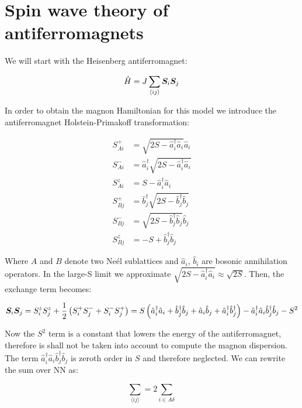 \chapter{Spin wave theory of antiferromagnets}
\label{SpinWave}

We will start with the Heisenberg antiferromagnet:

\begin{equation}
\hat{H} = J \sum_{\langle i j \rangle} \boldsymbol{S}_i \boldsymbol{S}_j
\end{equation}

In order to obtain the magnon Hamiltonian for this model we introduce the antiferromagnet Holstein-Primakoff transformation:

\begin{align}
S^+_{Ai} &= \sqrt{2S-\hat{a}^\dagger_i \hat{a}_i} \hat{a}_i \\
S^-_{Ai} &= \hat{a}^\dagger_i\sqrt{2S-\hat{a}^\dagger_i \hat{a}_i}  \\
S^z_{Ai} &= S - \hat{a}^\dagger_i \hat{a}_i \\
S^+_{Bj} &=\hat{b}^\dagger_j\sqrt{2S-\hat{b}^\dagger_j \hat{b}_j} \\
S^-_{Bj} &= \sqrt{2S-\hat{b}^\dagger_j \hat{b}_j} \hat{b}_j \\
S^z_{Bj} &= -S + \hat{b}^\dagger_j \hat{b}_j
\end{align}

Where $A$ and $B$ denote two Ne\'{e}l sublattices and $\hat{a}_i$, $\hat{b}_i$ are bosonic annihilation operators. In the large-S limit we approximate $ \sqrt{2S-\hat{a}^\dagger_i \hat{a}_i} \approx \sqrt{2S}$. Then, the exchange term becomes:

\begin{align*}
\boldsymbol{S}_i\boldsymbol{S}_j = S_i^zS_j^z + \frac{1}{2}\left(S_i^+S_j^- + S_i^-S_j^+ \right) = S \left( \hat{a}^\dagger_i \hat{a}_i + \hat{b}^\dagger_j \hat{b}_j + \hat{a}_i\hat{b}_j + \hat{a}^\dagger_i\hat{b}^\dagger_j \right) - \hat{a}^\dagger_i \hat{a}_i\hat{b}^\dagger_j \hat{b}_j - S^2
\end{align*}

Now the $S^2$ term is a constant that lowers the energy of the antiferromagnet, therefore is shall not be taken into account to compute the magnon dispersion. The term $\hat{a}^\dagger_i \hat{a}_i\hat{b}^\dagger_j \hat{b}_j$ is zeroth order in $S$ and therefore neglected. We can rewrite the sum over NN as:

\begin{equation}
\sum_{\langle i j \rangle} = 2\sum_{i \in A \delta}
\end{equation}


